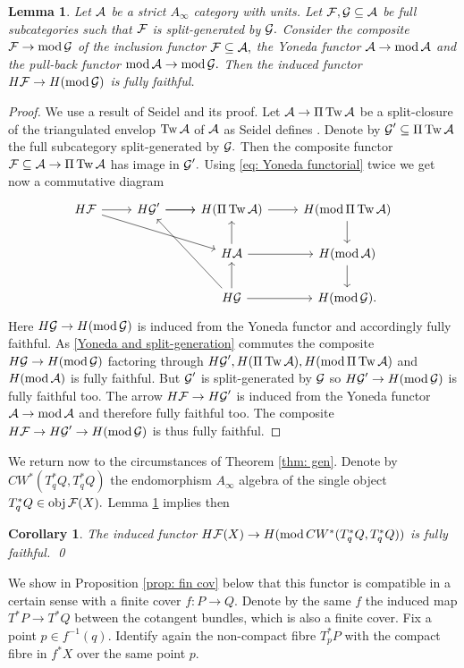 \documentclass{article}
\DeclareMathOperator{\Mod}{mod}\DeclareMathOperator{\supp}{supp}\DeclareMathOperator{\obj}{obj}
\DeclareMathOperator{\Tw}{Tw}
\theoremstyle{plain}%
\newtheorem{lem}[thm]{Lemma}
\newtheorem{cor}[thm]{Corollary}
\theoremstyle{definition}
\numberwithin{equation}{section}
\numberwithin{figure}{section}
\def\eq{\eqref}
\def\l{\label}
\def\cA{{\mathbin{\cal A}}}
\def\cF{{\mathbin{\cal F}}}
\def\cG{{\mathbin{\cal G}}}
\def\iy{\infty}
\def\sb{\subseteq}
\begin{document}
\begin{lem}\l{lem: Yoneda}
Let $\cA$ be a strict $A_\iy$ category with units. Let $\cF,\cG\sb\cA$ be full subcategories such that $\cF$ is split-generated by $\cG.$ Consider the composite $\cF\to\Mod\cG$ of the inclusion functor $\cF\sb\cA,$ the Yoneda functor $\cA\to\Mod\cA$ and the pull-back functor $\Mod\cA\to\Mod\cG.$
Then the induced functor $H\cF\to H(\Mod\cG)$ is fully faithful.
\end{lem}
\begin{proof}
We use a result of Seidel \cite[Lemma 4.7]{Seid3} and its proof. Let $\cA\to \Pi\Tw\cA$ be a split-closure of the triangulated envelop $\Tw\cA$ of $\cA$ as Seidel defines \cite[after Lemma 4.8]{Seid3}. Denote by $\cG'\sb \Pi\Tw\cA$ the full subcategory split-generated by $\cG.$
Then the composite functor $\cF\sb\cA\to\Pi\Tw\cA$ has image in $\cG'.$ Using \eq{eq: Yoneda functorial} twice we get now a commutative diagram
\begin{equation}\l{Yoneda and split-generation}
\begin{tikzcd}
H\cF\ar[r]\ar[drr]&H\cG'\ar[r]\ar[r] &H(\Pi\Tw\cA)\ar[r]& H(\Mod\Pi\Tw\cA)\ar[d]\\
 & & H\cA\ar[r]\ar[u]& H(\Mod\cA)\ar[d]\\
 & & H\cG\ar[r]\ar[uul]\ar[u]& H(\Mod\cG).
\end{tikzcd}
\end{equation}
Here $H\cG\to H(\Mod\cG)$ is induced from the Yoneda functor and accordingly fully faithful. 
As \eq{Yoneda and split-generation} commutes the composite $H\cG\to H(\Mod\cG)$ factoring through $H\cG',H(\Pi\Tw\cA),H(\Mod\Pi\Tw\cA)$ and $H(\Mod\cA)$ is fully faithful. 
But $\cG'$  is split-generated by $\cG$ so  $H\cG'\to H(\Mod\cG)$ is fully faithful too. 
The arrow $H\cF\to H\cG'$ is induced from the Yoneda functor $\cA\to\Mod\cA$ and therefore fully faithful too.
The composite $H\cF\to H\cG'\to H(\Mod\cG)$ is thus fully faithful. 
\end{proof}

We return now to the circumstances of Theorem \ref{thm: gen}. Denote by $CW^*(T_q^*Q,T_q^*Q)$ the endomorphism $A_\iy$ algebra of the single object $T_q^*Q\in \obj\cF(X).$ Lemma \ref{lem: Yoneda} implies then
\begin{cor}
The induced functor $H\cF(X)\to H(\Mod CW^*(T_q^*Q,T_q^*Q))$ is fully faithful. \qed
\end{cor}

We show in Proposition \ref{prop: fin cov} below that this functor is compatible in a certain sense with a finite cover $f:P\to Q.$ Denote by the same $f$ the induced map $T^*P\to T^*Q$ between the cotangent bundles, which is also a finite cover. Fix a point $p\in f^{-1}(q).$ Identify again the non-compact fibre $T^*_pP$ with the compact fibre in $f^*X$ over the same point $p.$
\end{document}
